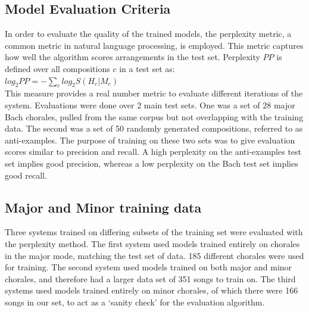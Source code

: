 \documentclass{sig-alternate}
\begin{document}
\subsection{Model Evaluation Criteria}
In order to evaluate the quality of the trained models, the perplexity metric, a common metric in natural language processing, is employed. This metric captures how well the algorithm scores arrangements in the test set. Perplexity $PP$ \cite{Koehn:2010:SMT:1734086} is defined over all compositions $c$ in a test set as:\\

$log_2 PP = - \sum_{c} log_2 S(H_{c} | M_{c})$\\

This measure provides a real number metric to evaluate different iterations of the system. Evaluations were done over 2 main test sets. One was a set of 28 major Bach chorales, pulled from the same corpus but not overlapping with the training data. The second was a set of 50 randomly generated compositions, referred to as anti-examples. The purpose of training on these two sets was to give evaluation scores similar to precision and recall. A high perplexity on the anti-examples test set implies good precision, whereas a low perplexity on the Bach test set implies good recall. 

\subsection{Major and Minor training data}
Three systems trained on differing subsets of the training set were evaluated with the perplexity method. 
The first system used models trained entirely on chorales in the major mode, matching the test set of data. 185 different chorales were used for training. The second system used models trained on both major and minor chorales, and therefore had a larger data set of 351 songs to train on. The third systems used models trained entirely on minor chorales, of which there were 166 songs in our set, to act as a `sanity check' for the evaluation algorithm.
\end{document}
